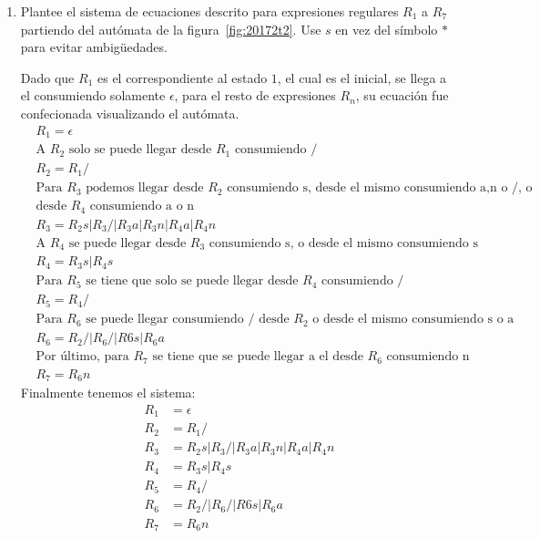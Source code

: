 \documentclass[spanish, fleqn]{article}
\begin{document}
  \begin{enumerate}
  \item %
    Plantee el sistema de ecuaciones descrito
    para expresiones regulares \(R_1\) a \(R_7\)
    partiendo del autómata de la figura~\ref{fig:20172t2}.
    Use \(s\) en vez del símbolo \(*\) para evitar ambigüedades.
    
    Dado que $R_{1}$ es el correspondiente al estado $1$, el cual es el inicial, se llega a el consumiendo solamente $\epsilon$, para el resto de expresiones $R_{n}$, su ecuación fue confecionada visualizando el autómata. 
    \begin{align*}
    &R_{1}=\epsilon \\
    &\text{A $R_2$ solo se puede llegar desde $R_1$ consumiendo /}\\
    &R_{2}=R_{1}/\\
    &\text{Para $R_3$ podemos llegar desde $R_2$ consumiendo s, desde el mismo consumiendo a,n o /, o}\\
    &\text{desde $R_4$ consumiendo a o n}\\
    &R_{3}=R_{2}s|R_{3}/|R_{3}a|R_{3}n|R_{4}a|R_{4}n\\
    &\text{A $R_4$ se puede llegar desde $R_3$ consumiendo s, o desde el mismo consumiendo s}\\
    &R_{4}=R_{3}s|R_{4}s
    \end{align*}
    \begin{align*}
    &\text{Para $R_5$ se tiene que solo se puede llegar desde $R_4$ consumiendo /}\\
    &R_{5}=R_{4}/\\
    &\text{Para $R_6$ se puede llegar consumiendo / desde $R_2$ o desde el mismo consumiendo s o a}\\
    &R_{6}=R_{2}/|R_{6}/|R{6}s|R_{6}a\\
    &\text{Por último, para $R_7$ se tiene que se puede llegar a el desde $R_6$ consumiendo n}\\
    &R_{7}=R_{6}n
    \end{align*}
    Finalmente tenemos el sistema:
    \begin{align*}
    R_{1}&=\epsilon \\
    R_{2}&=R_{1}/\\
    R_{3}&=R_{2}s|R_{3}/|R_{3}a|R_{3}n|R_{4}a|R_{4}n\\
    R_{4}&=R_{3}s|R_{4}s\\
    R_{5}&=R_{4}/\\
    R_{6}&=R_{2}/|R_{6}/|R{6}s|R_{6}a\\
    R_{7}&=R_{6}n\\
	\end{align*}
     

\end{enumerate}
\end{document}
